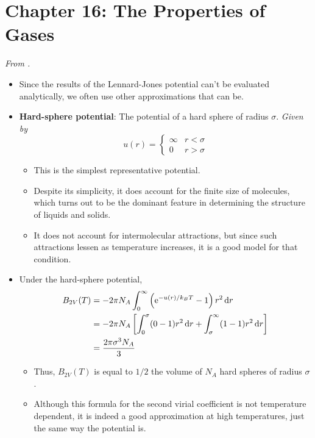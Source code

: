 \documentclass[../notes.tex]{subfiles}
\begin{document}
\section{Chapter 16: The Properties of Gases}
\emph{From \textcite{bib:McQuarrieSimon}.}
\begin{itemize}
    \item Since the results of the Lennard-Jones potential can't be evaluated analytically, we often use other approximations that can be.
    \item \textbf{Hard-sphere potential}: The potential of a hard sphere of radius $\sigma$. \emph{Given by}
    \begin{equation*}
        u(r) =
        \begin{cases}
            \infty & r<\sigma\\
            0 & r>\sigma
        \end{cases}
    \end{equation*}
    \begin{itemize}
        \item This is the simplest representative potential.
        \item Despite its simplicity, it does account for the finite size of molecules, which turns out to be the dominant feature in determining the structure of liquids and solids.
        \item It does not account for intermolecular attractions, but since such attractions lessen as temperature increases, it is a good model for that condition.
    \end{itemize}
    \item Under the hard-sphere potential,
    \begin{align*}
        B_{2V}(T) &= -2\pi N_A\int_0^\infty\left( \e[-u(r)/k_BT]-1 \right)r^2\dd{r}\\
        &= -2\pi N_A\left[ \int_0^\sigma(0-1)r^2\dd{r}+\int_\sigma^\infty(1-1)r^2\dd{r} \right]\\
        &= \frac{2\pi\sigma^3N_A}{3}
    \end{align*}
    \begin{itemize}
        \item Thus, $B_{2V}(T)$ is equal to $1/2$ the volume of $N_A$ hard spheres of radius $\sigma$.
        \item Although this formula for the second virial coefficient is not temperature dependent, it is indeed a good approximation at high temperatures, just the same way the potential is.
    \end{itemize}

\end{itemize}
\end{document}
